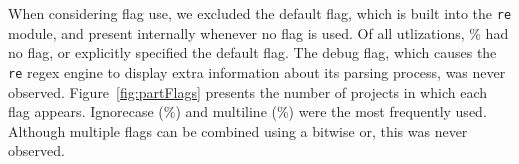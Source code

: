When considering flag use, we excluded the default flag, which is built into the {\tt re} module, and present internally whenever no flag is used.  Of all utlizations, \% had no flag, or explicitly specified the default flag.  The debug flag, which causes the {\tt re} regex engine to display extra information about its parsing process, was never observed.
 Figure~\ref{fig:partFlags} presents the number of projects in which each flag appears. Ignorecase (\%) and multiline (\%) were the most frequently used.   Although multiple flags can be combined using a bitwise or, this was never observed.



%
%
%
%
%
%
